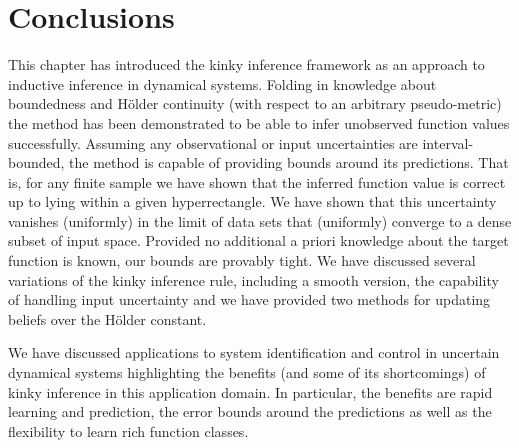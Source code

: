 %
%

%






%

%

%






\section{Conclusions}
This chapter has introduced the kinky inference framework as an approach to inductive inference in dynamical systems. Folding in knowledge about boundedness and H\"older continuity (with respect to an arbitrary pseudo-metric) the method has been demonstrated to be able to infer unobserved function values successfully. Assuming any observational or input uncertainties are interval-bounded, the method is capable of providing bounds around its predictions. That is, for any finite sample we have shown that the inferred function value is correct up to lying within a given hyperrectangle. We have shown that this uncertainty vanishes (uniformly) in the limit of data sets that (uniformly) converge to a dense subset of input space. Provided no additional a priori knowledge about the target function is known, our bounds are provably tight. We have discussed several variations of the kinky inference rule, including a smooth version, the capability of handling input uncertainty and we have provided two methods for updating beliefs over the H\"older constant. 


We have discussed applications to system identification and control in uncertain dynamical systems highlighting the benefits (and some of its shortcomings) of kinky inference in this application domain. 
In particular, the benefits are rapid learning and prediction, the error bounds around the predictions as well as the flexibility to learn rich function classes. 

